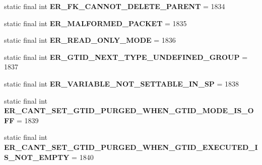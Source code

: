 \begin{DoxyCompactItemize}
static final int {\bfseries E\+R\+\_\+\+F\+K\+\_\+\+C\+A\+N\+N\+O\+T\+\_\+\+D\+E\+L\+E\+T\+E\+\_\+\+P\+A\+R\+E\+NT} = 1834
\item 
\mbox{\label{classcom_1_1mysql_1_1jdbc_1_1_mysql_error_numbers_a781cb175f9b9dcbc85f5ea519c0ab4b5}} 
static final int {\bfseries E\+R\+\_\+\+M\+A\+L\+F\+O\+R\+M\+E\+D\+\_\+\+P\+A\+C\+K\+ET} = 1835
\item 
\mbox{\label{classcom_1_1mysql_1_1jdbc_1_1_mysql_error_numbers_a5f80d41e1c3426ed0206eb2778b58107}} 
static final int {\bfseries E\+R\+\_\+\+R\+E\+A\+D\+\_\+\+O\+N\+L\+Y\+\_\+\+M\+O\+DE} = 1836
\item 
\mbox{\label{classcom_1_1mysql_1_1jdbc_1_1_mysql_error_numbers_adf5add75b36aa9c955c8fea426d80aab}} 
static final int {\bfseries E\+R\+\_\+\+G\+T\+I\+D\+\_\+\+N\+E\+X\+T\+\_\+\+T\+Y\+P\+E\+\_\+\+U\+N\+D\+E\+F\+I\+N\+E\+D\+\_\+\+G\+R\+O\+UP} = 1837
\item 
\mbox{\label{classcom_1_1mysql_1_1jdbc_1_1_mysql_error_numbers_a341c4c0f2f3ea200c60cc1cdc100dae4}} 
static final int {\bfseries E\+R\+\_\+\+V\+A\+R\+I\+A\+B\+L\+E\+\_\+\+N\+O\+T\+\_\+\+S\+E\+T\+T\+A\+B\+L\+E\+\_\+\+I\+N\+\_\+\+SP} = 1838
\item 
\mbox{\label{classcom_1_1mysql_1_1jdbc_1_1_mysql_error_numbers_a529f05f4ca67e78a4e6ad496c2ea7a3c}} 
static final int {\bfseries E\+R\+\_\+\+C\+A\+N\+T\+\_\+\+S\+E\+T\+\_\+\+G\+T\+I\+D\+\_\+\+P\+U\+R\+G\+E\+D\+\_\+\+W\+H\+E\+N\+\_\+\+G\+T\+I\+D\+\_\+\+M\+O\+D\+E\+\_\+\+I\+S\+\_\+\+O\+FF} = 1839
\item 
\mbox{\label{classcom_1_1mysql_1_1jdbc_1_1_mysql_error_numbers_a14ddc7522f40703348e095f2364c308d}} 
static final int {\bfseries E\+R\+\_\+\+C\+A\+N\+T\+\_\+\+S\+E\+T\+\_\+\+G\+T\+I\+D\+\_\+\+P\+U\+R\+G\+E\+D\+\_\+\+W\+H\+E\+N\+\_\+\+G\+T\+I\+D\+\_\+\+E\+X\+E\+C\+U\+T\+E\+D\+\_\+\+I\+S\+\_\+\+N\+O\+T\+\_\+\+E\+M\+P\+TY} = 1840
\item 
\mbox{\label{classcom_1_1mysql_1_1jdbc_1_1_mysql_error_numbers_a4171aa7dce5a8c70018ca8975114730c}} 

\end{DoxyCompactItemize}
